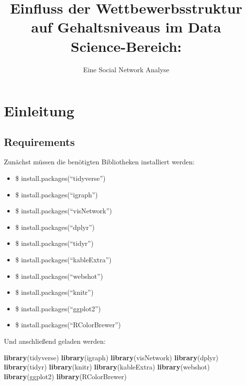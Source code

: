 \documentclass[
]{article}
\title{Einfluss der Wettbewerbsstruktur auf Gehaltsniveaus im Data
Science-Bereich:}
\subtitle{Eine Social Network Analyse}
\author{}
\date{\vspace{-2.5em}}
\newenvironment{Shaded}{\begin{snugshade}}{\end{snugshade}}
\newcommand{\FunctionTok}[1]{\textcolor[rgb]{0.13,0.29,0.53}{\textbf{#1}}}
\newcommand{\NormalTok}[1]{#1}
\providecommand{\tightlist}{%
  \setlength{\itemsep}{0pt}\setlength{\parskip}{0pt}}
\begin{document}
\maketitle

{
\setcounter{tocdepth}{3}
\tableofcontents
}
\newpage

\section{Einleitung}\label{einleitung}

\subsection{Requirements}\label{requirements}

Zunächst müssen die benötigten Bibliotheken installiert werden:

\begin{itemize}
\tightlist
\item
  \$ install.packages(``tidyverse'')
\item
  \$ install.packages(``igraph'')
\item
  \$ install.packages(``visNetwork'')
\item
  \$ install.packages(``dplyr'')
\item
  \$ install.packages(``tidyr'')
\item
  \$ install.packages(``kableExtra'')
\item
  \$ install.packages(``webshot'')
\item
  \$ install.packages(``knitr'')
\item
  \$ install.packages(``ggplot2'')
\item
  \$ install.packages(``RColorBrewer'')
\end{itemize}

Und anschließend geladen werden:

\begin{Shaded}
\begin{Highlighting}[]
\FunctionTok{library}\NormalTok{(tidyverse)}
\FunctionTok{library}\NormalTok{(igraph)}
\FunctionTok{library}\NormalTok{(visNetwork)}
\FunctionTok{library}\NormalTok{(dplyr)}
\FunctionTok{library}\NormalTok{(tidyr)}
\FunctionTok{library}\NormalTok{(knitr)}
\FunctionTok{library}\NormalTok{(kableExtra)}
\FunctionTok{library}\NormalTok{(webshot)}
\FunctionTok{library}\NormalTok{(ggplot2)}
\FunctionTok{library}\NormalTok{(RColorBrewer)}
\end{Highlighting}
\end{Shaded}
\end{document}
